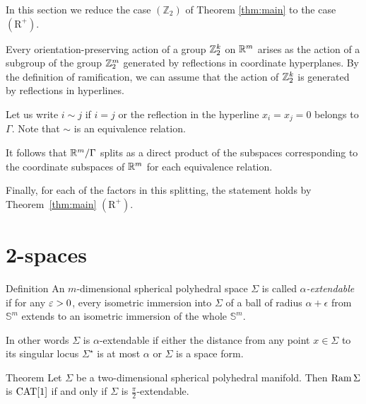 \documentclass[oneside,a4paper]{article}
\begin{document}
In this section we reduce the case $(\mathbb{Z}_2)$ of Theorem \ref{thm:main} to  the case $(\mathrm{R}^+)$.

Every orientation-preserving action of a group $\mathbb{Z}_2^k$ on $\mathbb{R}^m$ arises as
the action of a subgroup of the group $\mathbb{Z}_2^m$ generated by reflections in coordinate  hyperplanes.
By the definition of ramification, 
we can assume that the action of $\mathbb{Z}_2^k$ 
is generated by reflections in hyperlines.

Let us write $i\sim j$ if $i=j$ or  the reflection in
the hyperline $x_i=x_j=0$ belongs to $\Gamma$.
Note that $\sim$ is an equivalence relation.

It follows that $\mathbb{R}^m/\Gamma$ splits as a direct product of the subspaces corresponding to the coordinate subspaces of $\mathbb{R}^m$ for each equivalence relation.

Finally, for each of the factors in this splitting,
the statement holds by Theorem~\ref{thm:main} $(\mathrm{R}^+)$.
\qeds















\section{2-spaces}\label{ramsphere}

\begin{thm}{Definition} An $m$-dimensional spherical polyhedral space  $\Sigma$ is called \emph{$\alpha$-extendable}
if for any $\varepsilon>0$,
every isometric immersion into $\Sigma$
of a ball of radius $\alpha+\epsilon$
from $\mathbb{S}^m$ extends to an isometric immersion of the whole $\mathbb{S}^m$.

In other words
$\Sigma$ is $\alpha$-extendable if
either
the distance from any point $x\in \Sigma$
to its singular locus $\Sigma^{{\star}}$ is at most $\alpha$
or $\Sigma$ is a space form.
\end{thm}

\begin{thm}{Theorem}\label{thm:2D-sphere}
Let $\Sigma$ be a two-dimensional spherical polyhedral manifold.
 Then $\mathop{\rm Ram}\nolimits\Sigma$ is $\mathrm{CAT}[1]$ if and only if $\Sigma$ is $\frac{\pi}{2}$-extendable.
\end{thm}
\end{document}

